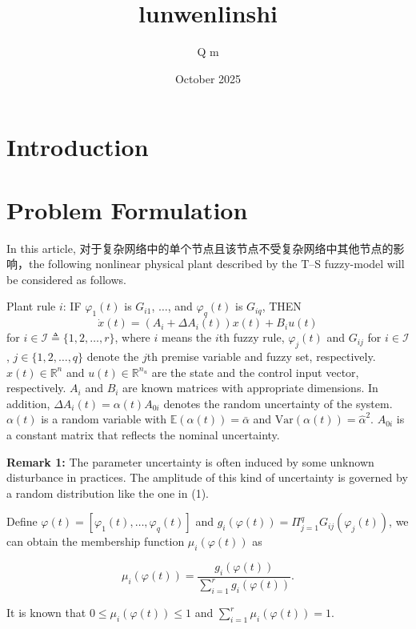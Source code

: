 \documentclass{article}
\title{lunwenlinshi}
\author{Q m}
\date{October 2025}
\begin{document}
\maketitle
\section{Introduction}
\section{Problem Formulation}
In this article, 对于复杂网络中的单个节点且该节点不受复杂网络中其他节点的影响，the following nonlinear physical plant described by the T–S fuzzy-model will be considered as follows.\

Plant rule $i$: IF $\varphi_1(t)$ is $G_{i1}$, $\ldots$, and $\varphi_q(t)$ is $G_{iq}$, THEN
\begin{equation}
\dot{x}(t) = (A_i + \Delta A_i(t))x(t) + B_i u(t)
\end{equation}
for $i \in \mathcal{I} \triangleq \{1, 2, \ldots, r\}$, where $i$ means the $i$th fuzzy rule, $\varphi_j(t)$ and $G_{ij}$ for $i \in \mathcal{I}$, $j \in \{1, 2, \ldots, q\}$ denote the $j$th premise variable and fuzzy set, respectively. $x(t) \in \mathbb{R}^n$ and $u(t) \in \mathbb{R}^{n_u}$ are the state and the control input vector, respectively. $A_i$ and $B_i$ are known matrices with appropriate dimensions. In addition, $\Delta A_i(t) = \alpha(t)A_{0i}$ denotes the random uncertainty of the system. $\alpha(t)$ is a random variable with $\mathbb{E}(\alpha(t)) = \bar{\alpha}$ and $\mathrm{Var}(\alpha(t)) = \hat{\alpha}^2$. $A_{0i}$ is a constant matrix that reflects the nominal uncertainty.\

\textbf{Remark 1:} The parameter uncertainty is often induced by some unknown disturbance in practices. The amplitude of this kind of uncertainty is governed by a random distribution like the one in (1).

Define $\varphi(t) = [\varphi_1(t), \ldots, \varphi_q(t)]$ and $g_i(\varphi(t)) = \Pi_{j=1}^{q} G_{ij}(\varphi_j(t))$, we can obtain the membership function $\mu_i(\varphi(t))$ as

\begin{equation}
\mu_i(\varphi(t)) = \frac{g_i(\varphi(t))}{\sum_{i=1}^{r} g_i(\varphi(t))}. 
\end{equation}

It is known that $0 \leq \mu_i(\varphi(t)) \leq 1$ and $\sum_{i=1}^{r} \mu_i(\varphi(t)) = 1$.
\end{document}
